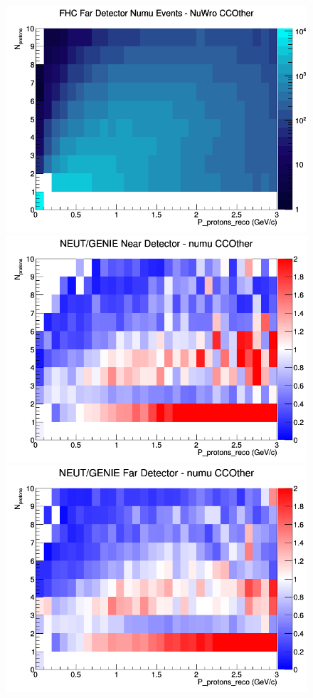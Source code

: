 \documentclass[12pt]{article}
\begin{document}
\begin{figure}[h]
\endminipage
{}
\includegraphics[width=\linewidth]{eff_N_P/LAr/protons/CCOther_FHC_FD_numu_N_P_NuWro.png}
\endminipage
\newline
{}
\includegraphics[width=\linewidth]{eff_N_P/LAr/protons/ratios/CCOther_NEUT_GENIE_numu_near_N_P.png}
\endminipage
{}
\includegraphics[width=\linewidth]{eff_N_P/LAr/protons/ratios/CCOther_NEUT_GENIE_numu_far_N_P.png}

\end{figure}
\end{document}
